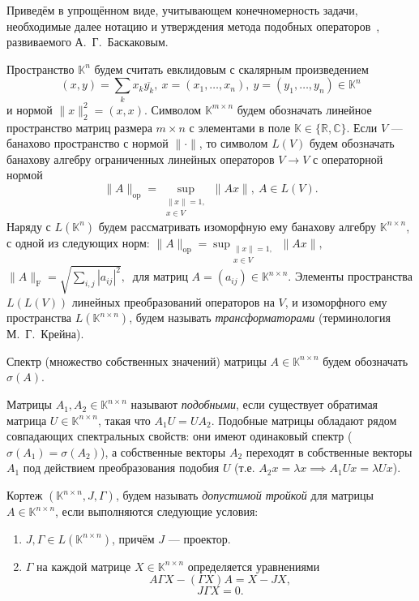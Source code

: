 Приведём в упрощённом виде, учитывающем конечномерность задачи,
    необходимые далее нотацию и утверждения
    метода подобных операторов~\cite{baskakov-harmonic,baskakov1983},
    развиваемого А.~Г.~Баскаковым.


Пространство \( \mathbb{K}^n \) 
    будем считать евклидовым с скалярным произведением
    \[
        (x, y){=}\sum_k x_k\overline{y_k},
        \ x{=}(x_1,\ldots, x_n),
        \ y=(y_1,\ldots, y_n)
        \in \mathbb{K}^n
        \]
    и нормой
    \(
        \|x\|_2^2{=}(x,x).
        \)
Символом \( \mathbb{K}^{m\times n} \)
    будем обозначать линейное пространство
    матриц размера \( m{\times}n \)
    с элементами в поле \( \mathbb{K}\in\{\mathbb{R},\mathbb{C}\} \).
Если \( V \) --- банахово пространство с нормой \( \|\cdot\| \),
    то символом \( L(V) \)
    будем обозначать банахову алгебру
    ограниченных линейных операторов \( V\to V \)
    с операторной нормой
\[
    \|A\|_{\mathrm{op}} = \sup_{\substack{\|x\|=1,\\ x\in V}} \|A x\|,\ A\in L(V).
    \]
Наряду с \( L(\mathbb{K}^n) \)
    будем рассматривать изоморфную ему
    банахову алгебру \( \mathbb{K}^{n\times n} \),
    с одной из следующих норм:
    \( \|A\|_{\mathrm{op}} = \sup_{\substack{\|x\|=1,\\ x\in V}} \|A x\|,\ \)
    \( \|A\|_{\mathrm{F}} = \sqrt{\sum_{i,j} |a_{ij}|^2},\ \)
    для матриц \( A{=}(a_{ij})\in\mathbb{K}^{n\times n} \).
Элементы пространства
    \( L(L(V)) \)
    линейных преобразований операторов на \( V \),
    и изоморфного ему пространства \( L(\mathbb{K}^{n\times n}) \),
    будем называть \emph{трансформаторами}
    (терминология М.~Г.~Крейна).

Спектр (множество собственных значений)
    матрицы \( A\in\mathbb{K}^{n\times n} \)
    будем обозначать \( \sigma(A) \).

Матрицы \( A_1, A_2 \in \mathbb{K}^{n\times n} \)
    называют \emph{подобными}, если существует
    обратимая матрица \( U\in\mathbb{K}^{n\times n} \),
    такая что \( A_1 U = U A_2 \).
Подобные матрицы обладают рядом совпадающих спектральных свойств:
    они имеют одинаковый спектр (\( \sigma(A_1)=\sigma(A_2) \)),
    а собственные векторы \( A_2 \) переходят
    в собственные векторы \( A_1 \) под действием
    преобразования подобия \( U \)
    (т.е. \( A_2 x = \lambda x \implies A_1 U x = \lambda U x \)).

Кортеж \( (\mathbb{K}^{n{\times}n}, J, \Gamma) \),
    будем называть \emph{допустимой тройкой}
    для матрицы \( A\in\mathbb{K}^{n\times n} \),
    если выполняются следующие условия:
\begin{enumerate}
\item
    \( J,\Gamma\in L(\mathbb{K}^{n{\times}n}) \),
    причём \( J \) --- проектор.
\item
    \( \Gamma \) на каждой матрице \( X\in \mathbb{K}^{n\times n} \)
    определяется уравнениями
    \[ A\Gamma X - (\Gamma X) A = X - JX, \]
    \[ J\Gamma X = 0. \]
\end{enumerate}

